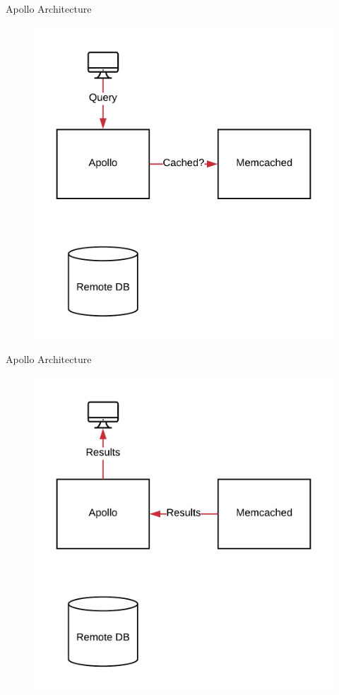 \documentclass[10pt]{beamer}
\begin{document}
\begin{frame}[fragile]{Apollo Architecture}
    \begin{figure}
        \includegraphics[scale=0.17]{apollo_arch_diagram_2}
    \end{figure}
\end{frame}

\begin{frame}[fragile]{Apollo Architecture}
    \begin{figure}
        \includegraphics[scale=0.17]{apollo_arch_diagram_3}
    \end{figure}
\end{frame}
\end{document}
